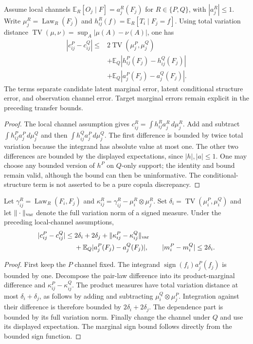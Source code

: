 \begin{proposition}
\label{prop:channel-split-r3}
Assume local channels
$\mathbb{E}_R[O_j\mid F]=a_j^R(F_j)$ for $R\in\{P,Q\}$,
with $|a_j^R|\le1$.
Write $\mu_j^R=\operatorname{Law}_R(F_j)$ and
$h_{ij}^R(f)=\mathbb{E}_R[T_i\mid F_j=f]$.
Using total variation distance
$\operatorname{TV}(\mu,\nu)=\sup_A|\mu(A)-\nu(A)|$, one has
\begin{align*}
 |c_{ij}^P-c_{ij}^Q|
 \le{}&2\operatorname{TV}(\mu_j^P,\mu_j^Q)\\
 &+\mathbb{E}_Q|h_{ij}^P(F_j)-h_{ij}^Q(F_j)|\\
 &+\mathbb{E}_Q|a_j^P(F_j)-a_j^Q(F_j)|.
\end{align*}
The terms separate candidate latent marginal error, latent conditional
structure error, and observation channel error. Target marginal errors
remain explicit in the preceding transfer bounds.
\end{proposition}
\begin{proof}
The local channel assumption gives
$c_{ij}^R=\int h_{ij}^R a_j^R\,d\mu_j^R$.
Add and subtract $\int h_{ij}^P a_j^P\,d\mu_j^Q$ and then
$\int h_{ij}^Q a_j^P\,d\mu_j^Q$.
The first difference is bounded by twice total variation because the
integrand has absolute value at most one. The other two differences are
bounded by the displayed expectations, since $|h|,|a|\le1$.
One may choose any bounded version of $h^P$ on $Q$-only support;
the identity and bound remain valid, although the bound can then be
uninformative. The conditional-structure term is not asserted to be a
pure copula discrepancy.
\end{proof}

\begin{proposition}
Let $\gamma_{ij}^R=\operatorname{Law}_R(F_i,F_j)$ and
$\kappa_{ij}^R=\gamma_{ij}^R-\mu_i^R\otimes\mu_j^R$.
Set $\delta_i=\operatorname{TV}(\mu_i^P,\mu_i^Q)$ and let
$\|\cdot\|_{\rm var}$ denote the full variation norm of a signed measure.
Under the preceding local-channel assumptions,
\begin{align*}
 |c_{ij}^P-c_{ij}^Q|
 \le{}&2\delta_i+2\delta_j+
       \|\kappa_{ij}^P-\kappa_{ij}^Q\|_{\rm var}\\
 &+\mathbb{E}_Q|a_j^P(F_j)-a_j^Q(F_j)|,
 \qquad |m_i^P-m_i^Q|\le2\delta_i.
\end{align*}
\end{proposition}
\begin{proof}
First keep the $P$ channel fixed. The integrand
$\operatorname{sign}(f_i)a_j^P(f_j)$ is bounded by one.
Decompose the pair-law difference into its product-marginal difference
and $\kappa_{ij}^P-\kappa_{ij}^Q$.
The product measures have total variation distance at most
$\delta_i+\delta_j$, as follows by adding and subtracting
$\mu_i^Q\otimes\mu_j^P$. Integration against their difference is
therefore bounded by $2\delta_i+2\delta_j$.
The dependence part is bounded by its full variation norm.
Finally change the channel under $Q$ and use its displayed expectation.
The marginal sign bound follows directly from the bounded sign function.
\end{proof}

